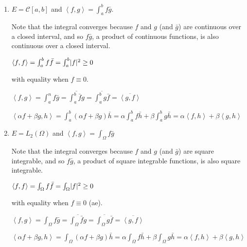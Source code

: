 \documentclass[letterpaper,12pt,fleqn]{article}
\newcommand{\inner}[2]{\left<#1,#2\right>}
\newcommand{\conj}[1]{\overline{#1}}
\renewcommand{\a}{\alpha}
\renewcommand{\b}{\beta}
\renewcommand{\O}{\Omega}
\newcommand{\mc}{\mathcal{C}}
\begin{document}
\begin{examples}
\begin{enumerate}
  \item $E=\mc[a,b]$ and $\inner{f}{g}=\int_a^bf\bar{g}$.

    Note that the integral converges because $f$ and $g$ (and $\bar{g}$) are
    continuous over a closed interval, and so $f\bar{g}$, a product of
    continuous functions, is also continuous over a closed interval.

    $\inner{f}{f}=\int_a^bf\bar{f}=\int_a^b\abs{f}^2\ge0$

    with equality when $f\equiv0$.

    $\inner{f}{g}=\int_a^nf\bar{g}=\conj{\int_a^b\bar{f}g}=
    \conj{\int_a^bg\bar{f}}=\conj{\inner{g}{f}}$

    $\inner{\a f+\b g}{h}=\int_a^b(\a f+\b g)\bar{h}=
    \a\int_a^bf\bar{h}+\b\int_a^bg\bar{h}=\a\inner{f}{h}+\b\inner{g}{h}$

  \item $E=L_2(\O)$ and $\inner{f}{g}=\int_{\O}f\bar{g}$

    Note that the integral converges because $f$ and $g$ (and $\bar{g}$) are
    square integrable, and so $f\bar{g}$, a product of square integrable
    functions, is also square integrable.

    $\inner{f}{f}=\int_{\O}f\bar{f}=\int_{\O}\abs{f}^2\ge0$

    with equality when $f\equiv0$ (ae).

    $\inner{f}{g}=\int_{\O}f\bar{g}=\conj{\int_{\O}\bar{f}g}=
    \conj{\int_{\O}g\bar{f}}=\conj{\inner{g}{f}}$

    $\inner{\a f+\b g}{h}=\int_{\O}(\a f+\b g)\bar{h}=
    \a\int_{\O}f\bar{h}+\b\int_{\O}g\bar{h}=\a\inner{f}{h}+\b\inner{g}{h}$
  \end{enumerate}
\end{examples}
\end{document}
